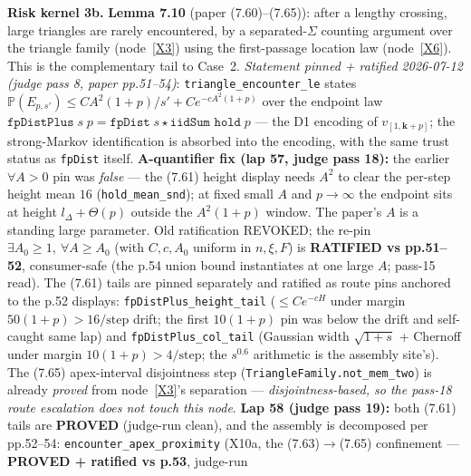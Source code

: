 \begin{lemma}\label{X10}
  \leanok
\textbf{Risk kernel 3b.}  \textbf{Lemma 7.10} (paper (7.60)--(7.65)): after a lengthy crossing,
large triangles are rarely encountered, by a separated-\(\Sigma\) counting argument over the
triangle family (node~\ref{X3}) using the first-passage location law (node~\ref{X6}).  This is
the complementary tail to Case~2.  \emph{Statement pinned + ratified 2026-07-12 (judge pass 8,
paper pp.51--54)}: \texttt{triangle\_encounter\_le} states \(\mathbb{P}(E_{p,s'}) \le
C A^2(1+p)/s' + C e^{-cA^2(1+p)}\) over the endpoint law \(\texttt{fpDistPlus}\;s\;p =
\texttt{fpDist}\;s \star \texttt{iidSum hold}\;p\) --- the D1 encoding of
\(v_{[1,\mathbf{k}+p]}\); the strong-Markov identification is absorbed into the encoding, with
the same trust status as \texttt{fpDist} itself.
\textbf{A-quantifier fix (lap 57, judge pass 18):} the earlier \(\forall A>0\) pin was
\emph{false} --- the (7.61) height display needs \(A^2\) to clear the per-step height
mean \(16\) (\texttt{hold\_mean\_snd}); at fixed small \(A\) and \(p\to\infty\) the
endpoint sits at height \(l_\Delta + \Theta(p)\) outside the \(A^2(1+p)\) window.  The
paper's \(A\) is a standing large parameter.  Old ratification REVOKED; the re-pin
\(\exists A_0 \ge 1,\ \forall A \ge A_0\) (with \(C, c, A_0\) uniform in \(n,\xi,F\))
is \textbf{RATIFIED vs pp.51--52}, consumer-safe (the p.54 union bound instantiates at
one large \(A\); pass-15 read).  The (7.61) tails are pinned separately and ratified as
route pins anchored to the p.52 displays: \texttt{fpDistPlus\_height\_tail}
(\(\le C e^{-cH}\) under margin \(50(1+p) > 16/\text{step}\) drift; the first
\(10(1+p)\) pin was below the drift and self-caught same lap) and
\texttt{fpDistPlus\_col\_tail} (Gaussian width \(\sqrt{1+s}\) + Chernoff under margin
\(10(1+p) > 4/\text{step}\); the \(s^{0.6}\) arithmetic is the assembly site's).  The
(7.65) apex-interval disjointness step (\texttt{TriangleFamily.not\_mem\_two}) is already
\emph{proved} from node~\ref{X3}'s separation --- \emph{disjointness-based, so the
pass-18 route escalation does not touch this node}.
\textbf{Lap 58 (judge pass 19):} both (7.61) tails are \textbf{PROVED} (judge-run clean),
and the assembly is decomposed per pp.52--54: \texttt{encounter\_apex\_proximity} (X10a,
the (7.63)\(\to\)(7.65) confinement --- \textbf{PROVED + ratified vs p.53}, judge-run

\end{lemma}
